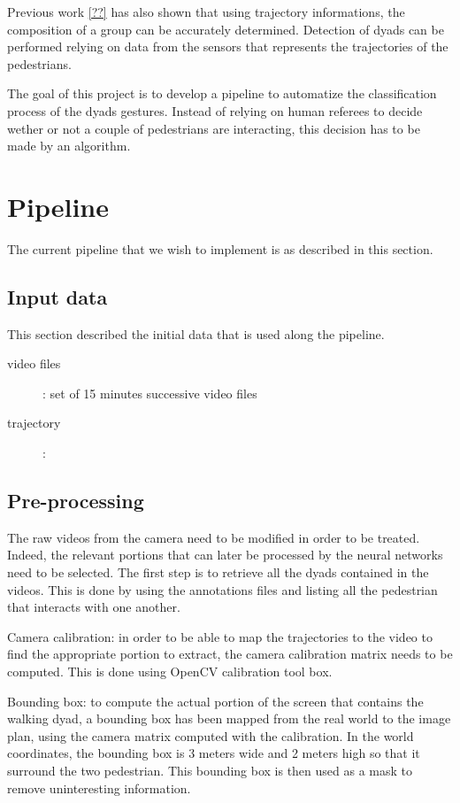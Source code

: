 \documentclass[12pt,a4paper,twoside]{article}
\begin{document}
Previous work \ref{??} has also shown that using trajectory informations, the composition of a group can be accurately determined. Detection of dyads can be performed relying on data from the sensors that represents the trajectories of the pedestrians.

The goal of this project is to develop a pipeline to automatize the classification process of the dyads gestures. Instead of relying on human referees to decide wether or not a couple of pedestrians are interacting, this decision has to be made by an algorithm.

\section{Pipeline}

The current pipeline that we wish to implement is as described in this section.

\subsection{Input data}
This section described the initial data that is used along the pipeline.
\begin{description}
    \item[video files]: set of 15 minutes successive video files
    \item[trajectory]: 
\end{description}

\subsection{Pre-processing}
The raw videos from the camera need to be modified in order to be treated. Indeed, the relevant portions that can later be processed by the neural networks need to be selected. The first step is to retrieve all the dyads contained in the videos. This is done by using the annotations files and listing all the pedestrian that interacts with one another.

Camera calibration: in order to be able to map the trajectories to the video to find the appropriate portion to extract, the camera calibration matrix needs to be computed. This is done using OpenCV calibration tool box. 

Bounding box: to compute the actual portion of the screen that contains the walking dyad, a bounding box has been mapped from the real world to the image plan, using the camera matrix computed with the calibration. In the world coordinates, the bounding box is 3 meters wide and 2 meters high so that it surround the two pedestrian. This bounding box is then used as a mask to remove uninteresting information.
\end{document}
